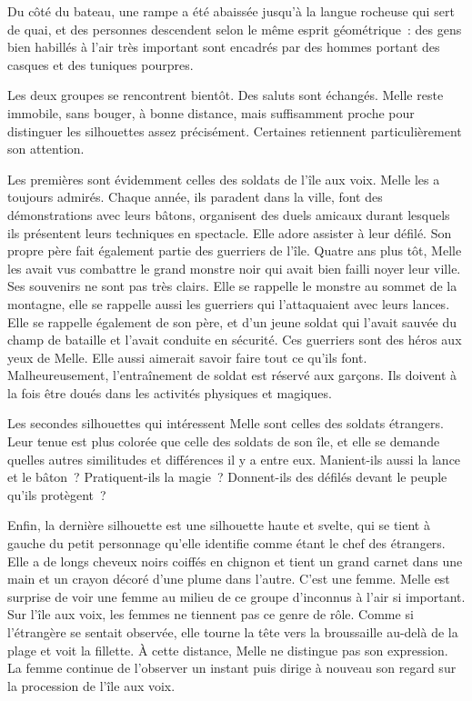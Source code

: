 Du côté du bateau, une rampe a été abaissée jusqu'à la langue rocheuse qui sert de quai, et des personnes descendent selon le même esprit géométrique~: des gens bien habillés à l'air très important sont encadrés par des hommes portant des casques et des tuniques pourpres.

Les deux groupes se rencontrent bientôt. Des saluts sont échangés. Melle reste immobile, sans bouger, à bonne distance, mais suffisamment proche pour distinguer les silhouettes assez précisément. Certaines retiennent particulièrement son attention.

Les premières sont évidemment celles des soldats de l'île aux voix. Melle les a toujours admirés. Chaque année, ils paradent dans la ville, font des démonstrations avec leurs bâtons, organisent des duels amicaux durant lesquels ils présentent leurs techniques en spectacle. Elle adore assister à leur défilé. Son propre père fait également partie des guerriers de l'île. Quatre ans plus tôt, Melle les avait vus combattre le grand monstre noir qui avait bien failli noyer leur ville. Ses souvenirs ne sont pas très clairs. Elle se rappelle le monstre au sommet de la montagne, elle se rappelle aussi les guerriers qui l'attaquaient avec leurs lances. Elle se rappelle également de son père, et d'un jeune soldat qui l'avait sauvée du champ de bataille et l'avait conduite en sécurité. Ces guerriers sont des héros aux yeux de Melle. Elle aussi aimerait savoir faire tout ce qu'ils font. Malheureusement, l'entraînement de soldat est réservé aux garçons. Ils doivent à la fois être doués dans les activités physiques et magiques.

Les secondes silhouettes qui intéressent Melle sont celles des soldats étrangers. Leur tenue est plus colorée que celle des soldats de son île, et elle se demande quelles autres similitudes et différences il y a entre eux. Manient-ils aussi la lance et le bâton~? Pratiquent-ils la magie~? Donnent-ils des défilés devant le peuple qu'ils protègent~?

Enfin, la dernière silhouette est une silhouette haute et svelte, qui se tient à gauche du petit personnage qu'elle identifie comme étant le chef des étrangers. Elle a de longs cheveux noirs coiffés en chignon et tient un grand carnet dans une main et un crayon décoré d'une plume dans l'autre. C'est une femme. Melle est surprise de voir une femme au milieu de ce groupe d'inconnus à l'air si important. Sur l'île aux voix, les femmes ne tiennent pas ce genre de rôle. Comme si l'étrangère se sentait observée, elle tourne la tête vers la broussaille au-delà de la plage et voit la fillette. À cette distance, Melle ne distingue pas son expression. La femme continue de l'observer un instant puis dirige à nouveau son regard sur la procession de l'île aux voix.

